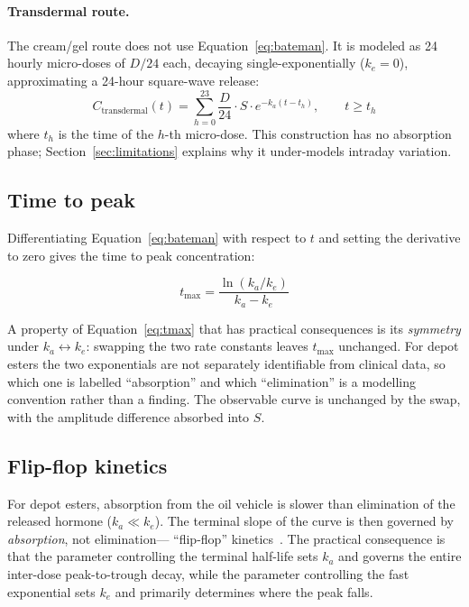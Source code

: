 \documentclass[11pt,a4paper]{article}
\begin{document}
\paragraph{Transdermal route.} The cream/gel route does not use
Equation~\ref{eq:bateman}. It is modeled as 24 hourly micro-doses of
$D/24$ each, decaying single-exponentially ($k_e = 0$), approximating a
24-hour square-wave release:
\begin{equation}
C_{\text{transdermal}}(t) = \sum_{h=0}^{23} \frac{D}{24} \cdot S \cdot e^{-k_a (t - t_h)},
\qquad t \ge t_h
\label{eq:transdermal}
\end{equation}
where $t_h$ is the time of the $h$-th micro-dose. This construction has
no absorption phase; Section~\ref{sec:limitations} explains why it
under-models intraday variation.

\subsection{Time to peak}
\label{sec:tmax}

Differentiating Equation~\ref{eq:bateman} with respect to $t$ and
setting the derivative to zero gives the time to peak concentration:

\begin{equation}
t_{\max} = \frac{\ln(k_a/k_e)}{k_a - k_e}
\label{eq:tmax}
\end{equation}

A property of Equation~\ref{eq:tmax} that has practical consequences is
its \emph{symmetry} under $k_a \leftrightarrow k_e$: swapping the two
rate constants leaves $t_{\max}$ unchanged. For depot esters the two
exponentials are not separately identifiable from clinical data, so
which one is labelled ``absorption'' and which ``elimination'' is a
modelling convention rather than a finding. The observable curve is
unchanged by the swap, with the amplitude difference absorbed into $S$.

\subsection{Flip-flop kinetics}
\label{sec:flipflop}

For depot esters, absorption from the oil vehicle is slower than
elimination of the released hormone ($k_a \ll k_e$). The terminal slope
of the curve is then governed by \emph{absorption}, not elimination---
``flip-flop'' kinetics~\cite{rowland2011}. The practical consequence is
that the parameter controlling the terminal half-life sets $k_a$ and
governs the entire inter-dose peak-to-trough decay, while the parameter
controlling the fast exponential sets $k_e$ and primarily determines
where the peak falls.
\end{document}

